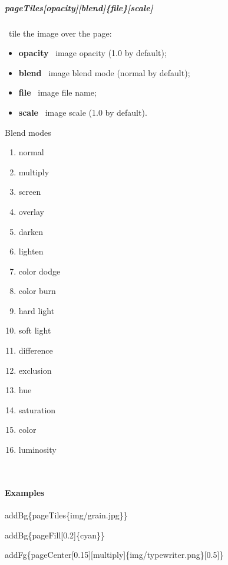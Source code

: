 \documentclass[english,12pt,openany,letterpaper]{book}
\begin{document}
\subparagraph{\bs pageTiles[opacity][blend]\{file\}[scale]} \dash\ tile the image over the page:
\begin{itemize}
	\item \textbf{opacity} \dash\ image opacity (1.0 by default);
	\item \textbf{blend} \dash\ image blend mode (normal by default);
	\item \textbf{file} \dash\ image file name;
	\item \textbf{scale} \dash\ image scale (1.0 by default).
\end{itemize}

\skipline

\begin{headerbox}{Blend modes}
\vspace*{-\baselineskip}\noindent\begin{multicols}{4}
	\begin{enumerate}
		\item normal
		\item multiply
		\item screen
		\item overlay
		\item darken
		\item lighten
		\item color dodge
		\item color burn
		\item hard light
		\item soft light
		\item difference
		\item exclusion
		\item hue
		\item saturation
		\item color
		\item luminosity
	\end{enumerate}
\end{multicols}
\vspace*{0.5ex-2\baselineskip}~
\end{headerbox}

\skipline

\paragraph{Examples}

\bs addBg\{\bs pageTiles\{img/grain.jpg\}\}

\bs addBg\{\bs pageFill[0.2]\{cyan\}\}

\bs addFg\{\bs pageCenter[0.15][multiply]\{img/typewriter.png\}[0.5]\}
\end{document}
